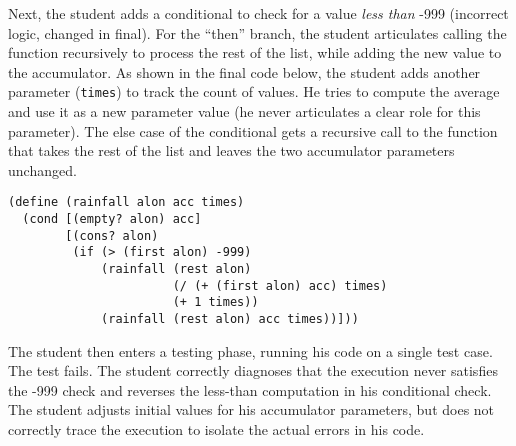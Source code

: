 Next, the student adds a conditional to
check for a value \emph{less than} -999 (incorrect
logic, changed in final).  For the ``then'' branch, the student articulates calling the
function recursively to process the rest of the list,
while adding the new value to the accumulator.  As shown in the final code
below, the student adds
another parameter (\lstinline{times}) to track the count of values.
He tries to compute the average and use it
as a new parameter value (he never articulates a clear role
for this parameter).  The
else case of the conditional gets a recursive call to the
function that takes the rest of the list and leaves the two
accumulator parameters unchanged.

\begin{lstlisting}
(define (rainfall alon acc times)
  (cond [(empty? alon) acc]
        [(cons? alon)
         (if (> (first alon) -999)
             (rainfall (rest alon)
                       (/ (+ (first alon) acc) times)
                       (+ 1 times))
             (rainfall (rest alon) acc times))]))
\end{lstlisting}

The student then enters a testing phase, running his code on a single
test case.  The test fails.  The student correctly diagnoses that the
execution never satisfies the -999 check and reverses the less-than
computation in his conditional check.  The student adjusts initial
values for his accumulator parameters, but does not correctly trace
the execution to isolate the actual errors in his code.


